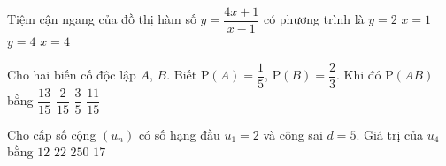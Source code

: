 \begin{ex}%
	Tiệm cận ngang của đồ thị hàm số $y=\dfrac{4x+1}{x-1}$ có phương trình là
	\choice
		{$y=2$}
		{$x=1$}
		{\True $y=4$}
		{$x=4$}
\end{ex}

\begin{ex}%
	Cho hai biến cố độc lập $A$, $B$. Biết $\mathrm{P}(A)=\dfrac{1}{5}$, $\mathrm{P}(B)=\dfrac{2}{3}$. Khi đó $\mathrm{P}(AB)$ bằng
	\choice
		{$\dfrac{13}{15}$}
		{\True $\dfrac{2}{15}$}
		{$\dfrac{3}{5}$}
		{$\dfrac{11}{15}$}
\end{ex}

\begin{ex}%
	Cho cấp số cộng $(u_n)$ có số hạng đầu $u_1=2$ và công sai $d=5$. Giá trị của $u_4$ bằng
	\choice
		{$12$}
		{$22$}
		{$250$}
		{\True $17$}
\end{ex}

